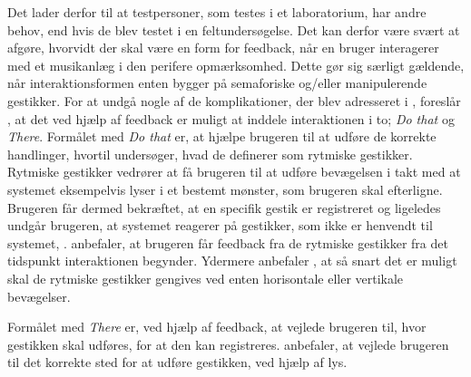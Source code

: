 Det lader derfor til at testpersoner, som testes i et laboratorium, har andre behov, end hvis de blev testet i en feltundersøgelse. Det kan derfor være svært at afgøre, hvorvidt der skal være en form for feedback, når en bruger interagerer med et musikanlæg i den perifere opmærksomhed. Dette gør sig særligt gældende, når interaktionsformen enten bygger på semaforiske og/eller manipulerende gestikker. \blankline 
%
For at undgå nogle af de komplikationer, der blev adresseret i , foreslår \textcite{PDF:DoThatThere}, at det ved hjælp af feedback er muligt at inddele interaktionen i to; \textit{Do that} og \textit{There}. Formålet med \textit{Do that} er, at hjælpe brugeren til at udføre de korrekte handlinger, hvortil \textcite[s. 4]{PDF:DoThatThere} undersøger, hvad de definerer som rytmiske gestikker. Rytmiske gestikker vedrører at få brugeren til at udføre bevægelsen i takt med at systemet eksempelvis lyser i et bestemt mønster, som brugeren skal efterligne. Brugeren får dermed bekræftet, at en specifik gestik er registreret og ligeledes undgår brugeren, at systemet reagerer på gestikker, som ikke er henvendt til systemet, \parencite[s. 4]{PDF:DoThatThere}. \textcite[s. 10]{PDF:DoThatThere} anbefaler, at brugeren får feedback fra de rytmiske gestikker fra det tidspunkt interaktionen begynder. Ydermere anbefaler \textcite[s. 10]{PDF:DoThatThere}, at så snart det er muligt skal de rytmiske gestikker gengives ved enten horisontale eller vertikale bevægelser. 

Formålet med \textit{There} er, ved hjælp af feedback, at vejlede brugeren til, hvor gestikken skal udføres, for at den kan registreres. \textcite[s. 10]{PDF:DoThatThere} anbefaler, at vejlede brugeren til det korrekte sted for at udføre gestikken, ved hjælp af lys. 
